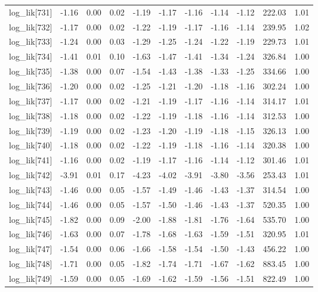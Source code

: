 \begin{table}[ht]
\begin{tabular}{rrrrrrrrrrr}
  log\_lik[731] & -1.16 & 0.00 & 0.02 & -1.19 & -1.17 & -1.16 & -1.14 & -1.12 & 222.03 & 1.01 \\ 
  log\_lik[732] & -1.17 & 0.00 & 0.02 & -1.22 & -1.19 & -1.17 & -1.16 & -1.14 & 239.95 & 1.02 \\ 
  log\_lik[733] & -1.24 & 0.00 & 0.03 & -1.29 & -1.25 & -1.24 & -1.22 & -1.19 & 229.73 & 1.01 \\ 
  log\_lik[734] & -1.41 & 0.01 & 0.10 & -1.63 & -1.47 & -1.41 & -1.34 & -1.24 & 326.84 & 1.00 \\ 
  log\_lik[735] & -1.38 & 0.00 & 0.07 & -1.54 & -1.43 & -1.38 & -1.33 & -1.25 & 334.66 & 1.00 \\ 
  log\_lik[736] & -1.20 & 0.00 & 0.02 & -1.25 & -1.21 & -1.20 & -1.18 & -1.16 & 302.24 & 1.00 \\ 
  log\_lik[737] & -1.17 & 0.00 & 0.02 & -1.21 & -1.19 & -1.17 & -1.16 & -1.14 & 314.17 & 1.01 \\ 
  log\_lik[738] & -1.18 & 0.00 & 0.02 & -1.22 & -1.19 & -1.18 & -1.16 & -1.14 & 312.53 & 1.00 \\ 
  log\_lik[739] & -1.19 & 0.00 & 0.02 & -1.23 & -1.20 & -1.19 & -1.18 & -1.15 & 326.13 & 1.00 \\ 
  log\_lik[740] & -1.18 & 0.00 & 0.02 & -1.22 & -1.19 & -1.18 & -1.16 & -1.14 & 320.38 & 1.00 \\ 
  log\_lik[741] & -1.16 & 0.00 & 0.02 & -1.19 & -1.17 & -1.16 & -1.14 & -1.12 & 301.46 & 1.01 \\ 
  log\_lik[742] & -3.91 & 0.01 & 0.17 & -4.23 & -4.02 & -3.91 & -3.80 & -3.56 & 253.43 & 1.01 \\ 
  log\_lik[743] & -1.46 & 0.00 & 0.05 & -1.57 & -1.49 & -1.46 & -1.43 & -1.37 & 314.54 & 1.00 \\ 
  log\_lik[744] & -1.46 & 0.00 & 0.05 & -1.57 & -1.50 & -1.46 & -1.43 & -1.37 & 520.35 & 1.00 \\ 
  log\_lik[745] & -1.82 & 0.00 & 0.09 & -2.00 & -1.88 & -1.81 & -1.76 & -1.64 & 535.70 & 1.00 \\ 
  log\_lik[746] & -1.63 & 0.00 & 0.07 & -1.78 & -1.68 & -1.63 & -1.59 & -1.51 & 320.95 & 1.01 \\ 
  log\_lik[747] & -1.54 & 0.00 & 0.06 & -1.66 & -1.58 & -1.54 & -1.50 & -1.43 & 456.22 & 1.00 \\ 
  log\_lik[748] & -1.71 & 0.00 & 0.05 & -1.82 & -1.74 & -1.71 & -1.67 & -1.62 & 883.45 & 1.00 \\ 
  log\_lik[749] & -1.59 & 0.00 & 0.05 & -1.69 & -1.62 & -1.59 & -1.56 & -1.51 & 822.49 & 1.00 \\ 

\end{tabular}
\end{table}
